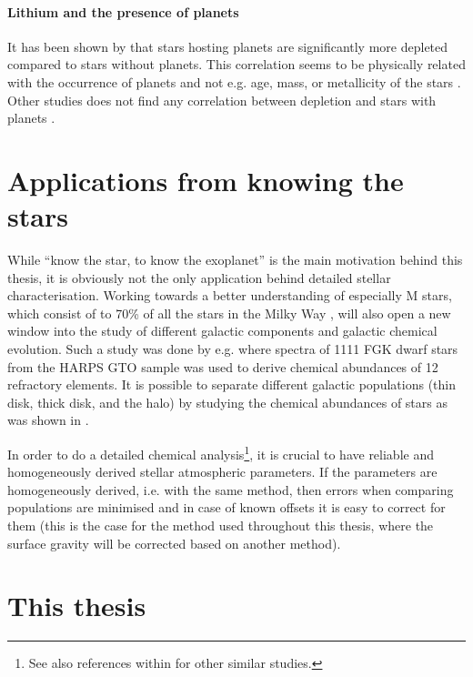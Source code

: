 \paragraph{Lithium and the presence of planets}

It has been shown by \citet{Israelian2004,Delgado2014,Figueira2014a,Gonzalez2015,Takeda2005} that
stars hosting planets are significantly more  depleted compared to stars without planets.
This correlation seems to be physically related with the occurrence of planets and not e.g. age,
mass, or metallicity of the stars \citep{Sousa2010}. Other studies does not find any correlation
between  depletion and stars with planets \citep{Baumann2010,Ramirez2012}.




\section{Applications from knowing the stars}
\label{sec:stars_application}

While ``know the star, to know the exoplanet'' is the main motivation behind this thesis, it is
obviously not the only application behind detailed stellar characterisation. Working towards a
better understanding of especially M stars, which consist of to 70\% of all the stars in the Milky
Way \citep{Bochanski2010}, will also open a new window into the study of different galactic
components and galactic chemical evolution. Such a study was done by e.g.
\citet{Adibekyan2012,Delgado2017} where spectra of 1111 FGK dwarf stars from the HARPS GTO sample
was used to derive chemical abundances of 12 refractory elements. It is possible to separate
different galactic populations (thin disk, thick disk, and the halo) by studying the chemical
abundances of stars as was shown in \citet{Adibekyan2012}.

In order to do a detailed chemical analysis\footnote{See also references within
\citet{Adibekyan2012} for other similar studies.}, it is crucial to have reliable and homogeneously
derived stellar atmospheric parameters. If the parameters are homogeneously derived, i.e. with the
same method, then errors when comparing populations are minimised and in case of known offsets it is
easy to correct for them (this is the case for the method used throughout this thesis, where the
surface gravity will be corrected based on another method).


\section{This thesis}
\label{sec:this_thesis}

